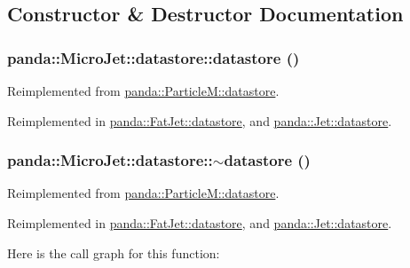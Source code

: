 \subsection{Constructor \& Destructor Documentation}
\hypertarget{structpanda_1_1MicroJet_1_1datastore_adac05a4e9f5487a0932162ad3781f8aa}{
\subsubsection[{datastore}]{\setlength{\rightskip}{0pt plus 5cm}panda::MicroJet::datastore::datastore ()}}
\label{structpanda_1_1MicroJet_1_1datastore_adac05a4e9f5487a0932162ad3781f8aa}


Reimplemented from \hyperlink{structpanda_1_1ParticleM_1_1datastore_acc9af307e2c4fee9bc5d9bbb37ad6124}{panda::ParticleM::datastore}.

Reimplemented in \hyperlink{structpanda_1_1FatJet_1_1datastore_a9705a085f7cb1355b03cbfff4f580dbf}{panda::FatJet::datastore}, and \hyperlink{structpanda_1_1Jet_1_1datastore_ae927a2e58d5ac6418b839d01dac0bd37}{panda::Jet::datastore}.\hypertarget{structpanda_1_1MicroJet_1_1datastore_a35979d6037e5229b018a32e3d0700360}{
\subsubsection[{$\sim$datastore}]{\setlength{\rightskip}{0pt plus 5cm}panda::MicroJet::datastore::$\sim$datastore ()}}
\label{structpanda_1_1MicroJet_1_1datastore_a35979d6037e5229b018a32e3d0700360}


Reimplemented from \hyperlink{structpanda_1_1ParticleM_1_1datastore_ae068980c20730bc8565d2f7ea701bc5e}{panda::ParticleM::datastore}.

Reimplemented in \hyperlink{structpanda_1_1FatJet_1_1datastore_ab30c9e78310606976935325a55cb10e6}{panda::FatJet::datastore}, and \hyperlink{structpanda_1_1Jet_1_1datastore_a70fb643b535f39f676287fe34d603e01}{panda::Jet::datastore}.

Here is the call graph for this function:

